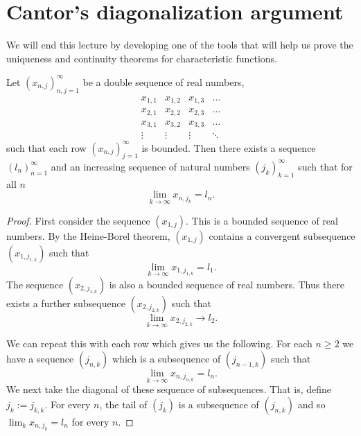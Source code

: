\section{Cantor's diagonalization argument}
We will end this lecture by developing one of the tools that will help us prove the uniqueness and continuity theorems for characteristic functions.
\begin{thrm}
    Let $(x_{n,j})_{n,j=1}^\infty$ be a double sequence of real numbers,
    \[\begin{matrix}
        x_{1,1}&x_{1,2}&x_{1,3}&\ldots\\
        x_{2,1}&x_{2,2}&x_{2,3}&\ldots \\
        x_{3,1}&x_{3,2}&x_{3,3}&\ldots \\
         \vdots &\vdots & \vdots & \ddots
    \end{matrix}\]
    such that each row $(x_{n,j})_{j=1}^\infty$ is bounded. Then there exists a sequence $(l_n)_{n=1}^\infty$ and an increasing sequence of natural numbers $(j_k)_{k=1}^\infty$ such that for all $n$
    \[\lim_{k \to \infty} x_{n,j_k} = l_n.\]
\end{thrm}
\begin{proof}
    First consider the sequence $(x_{1,j})$. This is a bounded sequence of real numbers. By the Heine-Borel theorem, $(x_{1,j})$ contains a convergent subsequence $(x_{1,j_{1,k}})$ such that \[\lim_{k\to \infty} x_{1,j_{1,k}} = l_1.\] 
    The sequence $(x_{2,j_{1,k}})$ is also a bounded sequence of real numbers. Thus there exists a further subsequence $(x_{2,j_{2,k}})$ such that \[\lim_{k\to \infty} x_{2,j_{2,k}} \to l_2.\]

    We can repeat this with each row which gives us the following. For each $n \ge 2$ we have a sequence $(j_{n,k})$ which is a subsequence of $(j_{n-1,k})$ such that \[\lim_{k\to \infty} x_{n,j_{n,k}} = l_n.\] 
    We next take the diagonal of these sequence of subsequences. That is, define $j_k := j_{k,k}$. For every $n$, the tail of $(j_k)$ is a subsequence of $(j_{n,k})$ and so $\lim_k x_{n,j_k} = l_n$ for every $n$. 
\end{proof}
